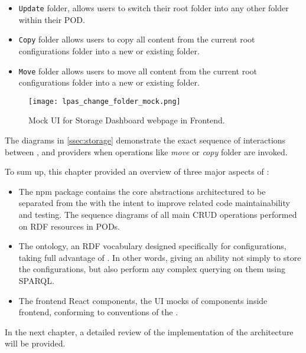 \begin{itemize}
    \item \texttt{Update} folder, allows users to switch their root folder into any other folder within their POD.
    \item \texttt{Copy} folder allows users to copy all content from the current root configurations folder into a new or existing folder.
    \item \texttt{Move} folder allows users to move all content from the current root configurations folder into a new or existing folder.
\end{itemize}


\begin{figure}[h]
\centering
\texttt{[image: lpas\_change\_folder\_mock.png]}
\caption{Mock UI for Storage Dashboard webpage in \lpa{} Frontend.}
\label{fig:lpas_change_folder_mock}
\end{figure}

The diagrams in \autoref{ssec:storage} demonstrate the exact sequence of interactions between \lpa{}, \lpas{} and \solid{} providers when operations like \textit{move} or \textit{copy} folder are invoked.

To sum up, this chapter provided an overview of three major aspects of \lpas:
\begin{itemize}
    \item The npm package contains the core abstractions architectured to be separated from the \lpa{} with the intent to improve \solid{} related code maintainability and testing. The sequence diagrams of all main CRUD operations performed on RDF resources in \solid{} PODs.
    \item The \lpas{} ontology, an RDF vocabulary designed specifically for \lpa{} configurations, taking full advantage of \solid{}. In other words, giving an ability not simply to store the \lpa{} configurations, but also perform any complex querying on them using SPARQL.
    \item The frontend React components, the UI mocks of components inside \lpa{} frontend, conforming to conventions of the \lpa{}.
\end{itemize}
In the next chapter, a detailed review of the implementation of the architecture will be provided.


